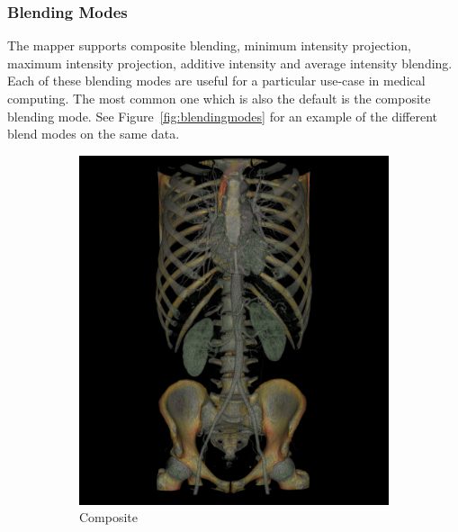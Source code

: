 \subsubsection{Blending Modes}
The mapper supports composite blending, minimum intensity projection, maximum
intensity projection, additive intensity and average intensity blending. Each of
these blending modes are useful for a particular use-case in medical computing.
The most common one which is also the default is the composite blending mode.
See Figure~\ref{fig:blendingmodes} for an example of the different blend modes
on the same data.

\begin{figure}[htbp]
  \centering
  \begin{subfigure}{.5\columnwidth}
    \includegraphics[width=\columnwidth]{TorsoBlendingComposite.png}
    \caption{Composite}
    \label{fig:blendcomposite}
  \end{subfigure}%
  \begin{subfigure}{.5\columnwidth}

\end{subfigure}
\end{figure}
